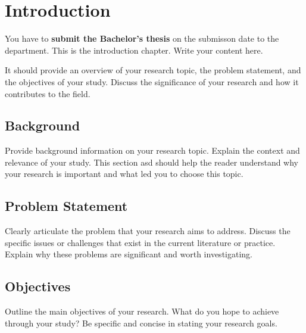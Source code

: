 \chapter{Introduction}

You have to \textbf{submit the Bachelor's thesis} on the submisson date to the department. This is the introduction chapter. Write your content here.

It should provide an overview of your research topic, the problem statement, and the objectives of your study. Discuss the significance of your research and how it contributes to the field.
\section{Background}
Provide background information on your research topic. Explain the context and relevance of your study. This section
asd should help the reader understand why your research is important and what led you to choose this topic.
\section{Problem Statement}
Clearly articulate the problem that your research aims to address. Discuss the specific issues or challenges that exist in the current literature or practice. Explain why these problems are significant and worth investigating.
\section{Objectives}
Outline the main objectives of your research. What do you hope to achieve through your study? Be specific and concise in stating your research goals.